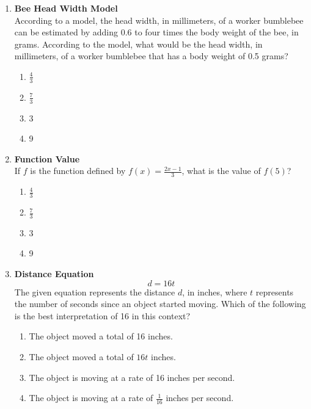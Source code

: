 \begin{enumerate}
\item \textbf{Bee Head Width Model}\\
According to a model, the head width, in millimeters, of a worker bumblebee can be estimated by adding 0.6 to four times the body weight of the bee, in grams. According to the model, what would be the head width, in millimeters, of a worker bumblebee that has a body weight of 0.5 grams?
\begin{enumerate}[label=(\Alph*)]
  \item $\frac{4}{3}$
  \item $\frac{7}{3}$
  \item 3
  \item 9
\end{enumerate}
\begin{subanswer}
\end{subanswer}

\item \textbf{Function Value}\\
If $f$ is the function defined by $f(x) = \frac{2x-1}{3}$, what is the value of $f(5)$?
\begin{enumerate}[label=(\Alph*)]
  \item $\frac{4}{3}$
  \item $\frac{7}{3}$
  \item 3
  \item 9
\end{enumerate}
\begin{subanswer}
\end{subanswer}

\item \textbf{Distance Equation}\\
$$
d = 16t
$$
The given equation represents the distance $d$, in inches, where $t$ represents the number of seconds since an object started moving. Which of the following is the best interpretation of 16 in this context?
\begin{enumerate}[label=(\Alph*)]
  \item The object moved a total of 16 inches.
  \item The object moved a total of $16t$ inches.
  \item The object is moving at a rate of 16 inches per second.
  \item The object is moving at a rate of $\frac{1}{16}$ inches per second.
\end{enumerate}
\begin{subanswer}
\end{subanswer}


\end{enumerate}
